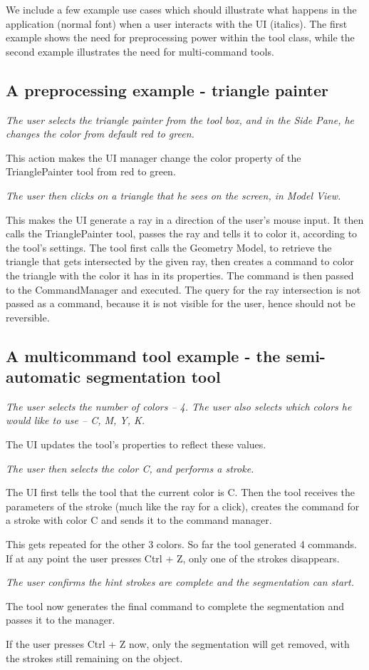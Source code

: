 We include a few example use cases which should illustrate what happens in the application (normal font) when a user interacts with the UI (italics). The first example shows the need for preprocessing power within the tool class, while the second example illustrates the need for multi-command tools.

\subsection{A preprocessing example - triangle painter}
\textit{The user selects the triangle painter from the tool box, and in the Side Pane, he changes the color from default red to green.}

This action makes the UI manager change the color property of the TrianglePainter tool from red to green.

\textit{The user then clicks on a triangle that he sees on the screen, in Model View.}

This makes the UI generate a ray in a direction of the user's mouse input. It then calls the TrianglePainter tool, passes the ray and tells it to color it, according to the tool's settings. The tool first calls the Geometry Model, to retrieve the triangle that gets intersected by the given ray, then creates a command to color the triangle with the color it has in its properties. The command is then passed to the CommandManager and executed. The query for the ray intersection is not passed as a command, because it is not visible for the user, hence should not be reversible.

\subsection{A multicommand tool example - the semi-automatic segmentation tool}
\textit{The user selects the number of colors -- 4. The user also selects which colors he would like to use -- C, M, Y, K.}

The UI updates the tool's properties to reflect these values.

\textit{The user then selects the color C, and performs a stroke.}

The UI first tells the tool that the current color is C. Then the tool receives the parameters of the stroke (much like the ray for a click), creates the command for a stroke with color C and sends it to the command manager.

This gets repeated for the other 3 colors. So far the tool generated 4 commands. If at any point the user presses Ctrl + Z, only one of the strokes disappears.

\textit{The user confirms the hint strokes are complete and the segmentation can start.}

The tool now generates the final command to complete the segmentation and passes it to the manager.


If the user presses Ctrl + Z now, only the segmentation will get removed, with the strokes still remaining on the object.